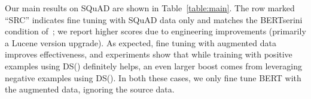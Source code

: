 \documentclass[11pt,a4paper]{article}
\begin{document}
\begin{table}[t]
\centering{}
\caption{Results on }
\label{table:main}
\end{table}

Our main results on SQuAD are shown in Table~\ref{table:main}.
The row marked ``SRC'' indicates fine tuning with SQuAD data only and matches the BERTserini condition of~\citet{yang2019end}; we report higher scores due to engineering improvements (primarily a Lucene version upgrade).
As expected, fine tuning with augmented data improves effectiveness, and experiments show that while training with positive examples using DS() definitely helps, an even larger boost comes from leveraging negative examples using DS().
In both these cases, we only fine tune BERT with the augmented data, ignoring the source data.
\end{document}
